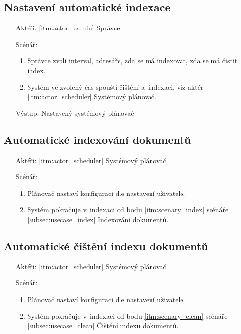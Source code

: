 \subsection{Nastavení automatické indexace}
\begin{itemize}
	\item[Aktéři:] \ref{itm:actor_admin} Správce
	\item[Scénář:]
	\begin{enumerate}
		\item Správce zvolí interval, adresáře, zda se má indexovat, zda se má čistit index.
		\item Systém ve zvolený čas spouští čištění a~indexaci, viz aktér \ref{itm:actor_scheduler}  Systémový plánovač.
	\end{enumerate}
	\item[Výstup:] Nastavený systémový plánovač
\end{itemize}

\subsection{Automatické indexování dokumentů}
\begin{itemize}
	\item[Aktéři:] \ref{itm:actor_scheduler} Systémový plánovač
	\item[Scénář:]
	\begin{enumerate}
		\item Plánovač nastaví konfiguraci dle nastavení uživatele.
		\item Systém pokračuje v~indexaci od bodu \ref{itm:scenary_index} scénáře \ref{subsec:usecase_index} Indexování dokumentů.
	\end{enumerate}
\end{itemize}

\subsection{Automatické čištění indexu dokumentů}
\begin{itemize}
	\item[Aktéři:] \ref{itm:actor_scheduler} Systémový plánovač
	\item[Scénář:]
	\begin{enumerate}
		\item Plánovač nastaví konfiguraci dle nastavení uživatele.
		\item Systém pokračuje v~indexaci od bodu \ref{itm:scenary_clean} scénáře \ref{subsec:usecase_clean} Čištění indexu dokumentů.
	\end{enumerate}
\end{itemize}

